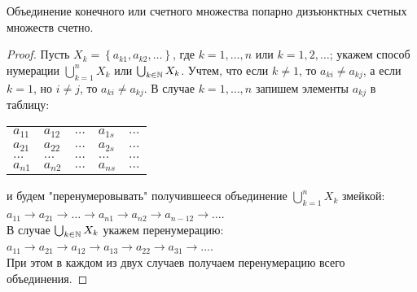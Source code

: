 \documentclass[main]{subfiles}
\begin{document}
\begin{theorem}
    Объединение конечного или счетного множества попарно дизъюнктных 
    счетных множеств счетно.
\end{theorem}
\begin{proof}
    Пусть $X_k = \left\{a_{k1}, a_{k2}, \ldots\right\}$, где $k = 1,\ldots, n$
    или $k = 1,2, \ldots$; укажем способ нумерации $\bigcup_{k=1}^nX_k$ или 
    $\bigcup_{k \in \mathbb{N}}X_k$. Учтем, что если $k \neq 1$, то $a_{ki} \neq a_{kj}$,
    а если $k = 1$, но $i \neq j$, то $a_{ki} \neq a_{kj}$. В случае
    $k = 1,\ldots, n$ запишем элементы $a_{kj}$ в таблицу:
    \begin{center}
        \begin{tabular}{l l l l l}
            $a_{11}$ & $a_{12}$ & $\ldots$ & $a_{1s}$ & $\ldots$ \\
            $a_{21}$ & $a_{22}$ & $\ldots$ & $a_{2s}$ & $\ldots$ \\
            $\ldots$ & $\ldots$ & $\ldots$ & $\ldots$ & $\ldots$ \\
            $a_{n1}$ & $a_{n2}$ & $\ldots$ & $a_{ns}$ & $\ldots$ \\
        \end{tabular}
    \end{center}
    и будем "перенумеровывать" получившееся объединение $\bigcup_{k=1}^nX_k$
    змейкой: $a_{11} \rightarrow a_{21} \rightarrow \ldots
    \rightarrow a_{n1} \rightarrow a_{n2} \rightarrow a_{n-1 2} 
    \rightarrow \ldots$. \\
    В случае $\bigcup_{k \in \mathbb{N}}X_k$ укажем перенумерацию: $a_{11} \rightarrow
    a_{21} \rightarrow a_{12} \rightarrow a_{13} \rightarrow a_{22} 
    \rightarrow a_{31} \rightarrow \ldots$. \\
    При этом в каждом из двух случаев получаем перенумерацию всего объединения.
\end{proof}
\end{document}
